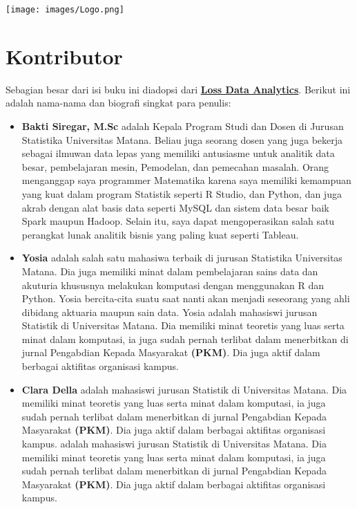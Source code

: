 \documentclass[
]{book}
\providecommand{\tightlist}{%
  \setlength{\itemsep}{0pt}\setlength{\parskip}{0pt}}
\begin{document}
\texttt{[image: images/Logo.png]}

\hypertarget{kontributor}{%
\section*{Kontributor}\label{kontributor}}

Sebagian besar dari isi buku ini diadopsi dari \textbf{\href{https://openacttexts.github.io/Loss-Data-Analytics/ChapIntro.html}{Loss Data Analytics}}. Berikut ini adalah nama-nama dan biografi singkat para penulis:

\begin{itemize}
\tightlist
\item
  \textbf{Bakti Siregar, M.Sc} adalah Kepala Program Studi dan Dosen di Jurusan Statistika Universitas Matana. Beliau juga seorang dosen yang juga bekerja sebagai ilmuwan data lepas yang memiliki antusiasme untuk analitik data besar, pembelajaran mesin, Pemodelan, dan pemecahan masalah. Orang menganggap saya programmer Matematika karena saya memiliki kemampuan yang kuat dalam program Statistik seperti R Studio, dan Python, dan juga akrab dengan alat basis data seperti MySQL dan sistem data besar baik Spark maupun Hadoop. Selain itu, saya dapat mengoperasikan salah satu perangkat lunak analitik bisnis yang paling kuat seperti Tableau.
\end{itemize}

\begin{itemize}
\tightlist
\item
  \textbf{Yosia} adalah salah satu mahasiwa terbaik di jurusan Statistika Universitas Matana. Dia juga memiliki minat dalam pembelajaran sains data dan akuturia khususnya melakukan komputasi dengan menggunakan R dan Python. Yosia bercita-cita suatu saat nanti akan menjadi seseorang yang ahli dibidang aktuaria maupun sain data. Yosia adalah mahasiswi jurusan Statistik di Universitas Matana. Dia memiliki minat teoretis yang luas serta minat dalam komputasi, ia juga sudah pernah terlibat dalam menerbitkan di jurnal Pengabdian Kepada Masyarakat \textbf{(PKM)}. Dia juga aktif dalam berbagai aktifitas organisasi kampus.
\end{itemize}

\begin{itemize}
\tightlist
\item
  \textbf{Clara Della} adalah mahasiswi jurusan Statistik di Universitas Matana. Dia memiliki minat teoretis yang luas serta minat dalam komputasi, ia juga sudah pernah terlibat dalam menerbitkan di jurnal Pengabdian Kepada Masyarakat \textbf{(PKM)}. Dia juga aktif dalam berbagai aktifitas organisasi kampus. adalah mahasiswi jurusan Statistik di Universitas Matana. Dia memiliki minat teoretis yang luas serta minat dalam komputasi, ia juga sudah pernah terlibat dalam menerbitkan di jurnal Pengabdian Kepada Masyarakat \textbf{(PKM)}. Dia juga aktif dalam berbagai aktifitas organisasi kampus.
\end{itemize}
\end{document}
